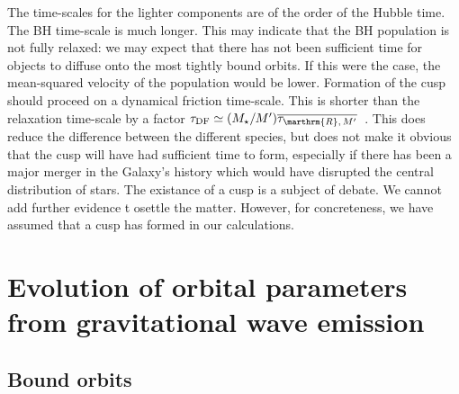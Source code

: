 \documentclass[useAMS,usedcolumn,usegraphicx,usenatbib]{mn2e}
\newcommand{\sub}[1]{\ensuremath{_\mathrm{#1}}}
\begin{document}
\begin{onecolumn}
The time-scales for the lighter components are of the order of the Hubble time. The BH time-scale is much longer. This may indicate that the BH population is not fully relaxed: we may expect that there has not been sufficient time for objects to diffuse onto the most tightly bound orbits. If this were the case, the mean-squared velocity of the population would be lower. Formation of the cusp should proceed on a dynamical friction time-scale. This is shorter than the relaxation time-scale by a factor $\tau\sub{DF} \simeq (M_\star/M')\overline{\tau_{\marthrm{R},\,M'}}$~\citep[section 3.4]{Spitzer1987}. This does reduce the difference between the different species, but does not make it obvious that the cusp will have had sufficient time to form, especially if there has been a major merger in the Galaxy's history which would have disrupted the central distribution of stars. The existance of a cusp is a subject of debate. We cannot add further evidence t osettle the matter. However, for concreteness, we have assumed that a cusp has formed in our calculations.

\section{Evolution of orbital parameters from gravitational wave emission}

\subsection{Bound orbits}


\end{onecolumn}
\end{document}

